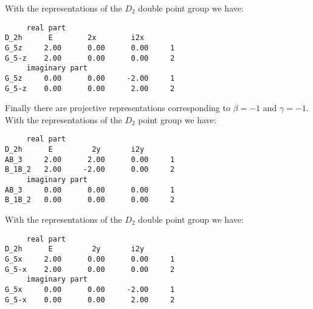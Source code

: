 \documentclass[12pt,a4paper,twoside]{report}
\begin{document}
With the representations of the $D_2$ double point group we have:

\begin{tcolorbox}
\begin{footnotesize}
\begin{verbatim}
     real part
D_2h      E        2x        i2x
G_5z     2.00      0.00      0.00     1
G_5-z    2.00      0.00      0.00     2
     imaginary part
G_5z     0.00      0.00     -2.00     1
G_5-z    0.00      0.00      2.00     2
\end{verbatim}
\end{footnotesize}
\end{tcolorbox}

Finally there are projective representations corresponding to
$\beta=-1$ and $\gamma=-1$. With the representations of the $D_2$ point
group we have: 

\begin{tcolorbox}
\begin{footnotesize}
\begin{verbatim}
     real part
D_2h      E         2y       i2y
AB_3     2.00      2.00      0.00     1
B_1B_2   2.00     -2.00      0.00     2
     imaginary part
AB_3     0.00      0.00      0.00     1
B_1B_2   0.00      0.00      0.00     2
\end{verbatim}
\end{footnotesize}
\end{tcolorbox}

With the representations of the $D_2$ double point group we have:

\begin{tcolorbox}
\begin{footnotesize}
\begin{verbatim}
     real part
D_2h      E         2y       i2y
G_5x     2.00      0.00      0.00     1
G_5-x    2.00      0.00      0.00     2
     imaginary part
G_5x     0.00      0.00     -2.00     1
G_5-x    0.00      0.00      2.00     2
\end{verbatim}
\end{footnotesize}
\end{tcolorbox}
\end{document}
